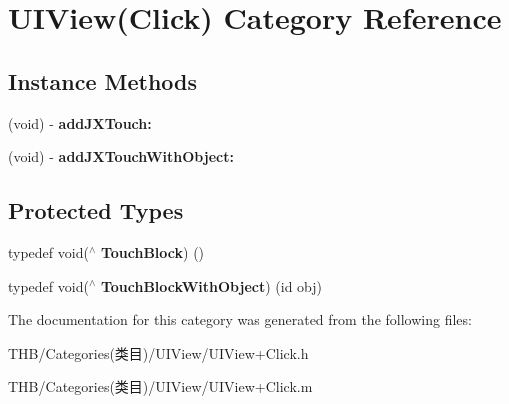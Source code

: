 \hypertarget{category_u_i_view_07_click_08}{}\section{U\+I\+View(Click) Category Reference}
\label{category_u_i_view_07_click_08}
\subsection*{Instance Methods}
\begin{DoxyCompactItemize}
\item 
\mbox{\label{category_u_i_view_07_click_08_ab728cb1d1461a0f1bebf231f5c7c9d57}} 
(void) -\/ {\bfseries add\+J\+X\+Touch\+:}
\item 
\mbox{\label{category_u_i_view_07_click_08_a9545551b1148ac792e97ebc3bf0b8e1b}} 
(void) -\/ {\bfseries add\+J\+X\+Touch\+With\+Object\+:}
\end{DoxyCompactItemize}
\subsection*{Protected Types}
\begin{DoxyCompactItemize}
\item 
\mbox{\label{category_u_i_view_07_click_08_a0f458cecfa4deb8297596ca5b30526dc}} 
typedef void($^\wedge$ {\bfseries Touch\+Block}) ()
\item 
\mbox{\label{category_u_i_view_07_click_08_a0cbe1f79ae8196e268ba3edd0984be2f}} 
typedef void($^\wedge$ {\bfseries Touch\+Block\+With\+Object}) (id obj)
\end{DoxyCompactItemize}


The documentation for this category was generated from the following files\+:\begin{DoxyCompactItemize}
\item 
T\+H\+B/\+Categories(类目)/\+U\+I\+View/U\+I\+View+\+Click.\+h\item 
T\+H\+B/\+Categories(类目)/\+U\+I\+View/U\+I\+View+\+Click.\+m\end{DoxyCompactItemize}

